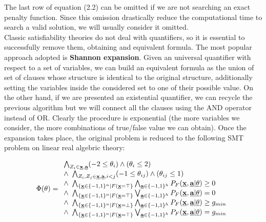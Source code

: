 The last row of equation (2.2) can be omitted if we are not searching an exact penalty function. Since this omission drastically reduce the computational time to search a valid solution, we will usually consider it omitted. \\
Classic satisfiability theories do not deal with quantifiers, so it is essential to successfully remove them, obtaining and equivalent formula. The most popular approach adopted is \textbf{Shannon expansion}. Given an universal quantifier with respect to a set of variables, we can build an equivalent formula as the union of set of clauses whose structure is identical to the original structure, additionally setting the variables inside the considered set to one of their possible value. On the other hand, if we are presented an existential quantifier, we can recycle the previous algorithm but we will connect all the clauses using the AND operator instead of OR. Clearly the procedure is exponential (the more variables we consider, the more combinations of true/false value we can obtain). Once the expansion takes place, the original problem is reduced to the following SMT problem on linear real algebric theory:

\begin{equation}
    \Phi(\theta) =
        \begin{array}{lr}
            \bigwedge_{Z_i\in\textbf{\underline{x}},\textbf{\underline{a}}}(-2\leq\theta_i) \land (\theta_i\leq 2) \\
            \land\  \bigwedge_{Z_i,Z_j\in\textbf{\underline{x}},\textbf{\underline{a}}, i<j}(-1\leq\theta_{ij}) \land (\theta_{ij}\leq 1) \\
            \land\ \bigwedge_{\{\textbf{\underline{x}}\in\{-1,1\}^n|F(\textbf{\underline{x}}=\top\}} \bigwedge_{\textbf{\underline{a}}\in\{-1,1\}^h}P_F(\underline{\textbf{x}},\underline{\textbf{a}} | \underline{\theta}) \geq 0 \\
            \land\ \bigwedge_{\{\textbf{\underline{x}}\in\{-1,1\}^n|F(\textbf{\underline{x}}=\top\}} \bigvee_{\textbf{\underline{a}}\in\{-1,1\}^h}P_F(\underline{\textbf{x}},\underline{\textbf{a}} | \underline{\theta}) = 0 \\
            \land\ \bigwedge_{\{\textbf{\underline{x}}\in\{-1,1\}^n|F(\textbf{\underline{x}}=\bot\}} \bigwedge_{\textbf{\underline{a}}\in\{-1,1\}^h}P_F(\underline{\textbf{x}},\underline{\textbf{a}} | \underline{\theta}) \geq g_{min} \\
            \land\ \bigwedge_{\{\textbf{\underline{x}}\in\{-1,1\}^n|F(\textbf{\underline{x}}=\top\}} \bigvee_{\textbf{\underline{a}}\in\{-1,1\}^h}P_F(\underline{\textbf{x}},\underline{\textbf{a}} | \underline{\theta}) = g_{min} \\
        \end{array}
\end{equation}

